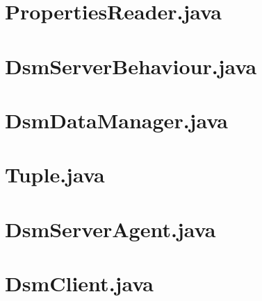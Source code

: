 \section{PropertiesReader.java}


\section{DsmServerBehaviour.java}


\section{DsmDataManager.java}


\section{Tuple.java}


\section{DsmServerAgent.java}


\section{DsmClient.java}

